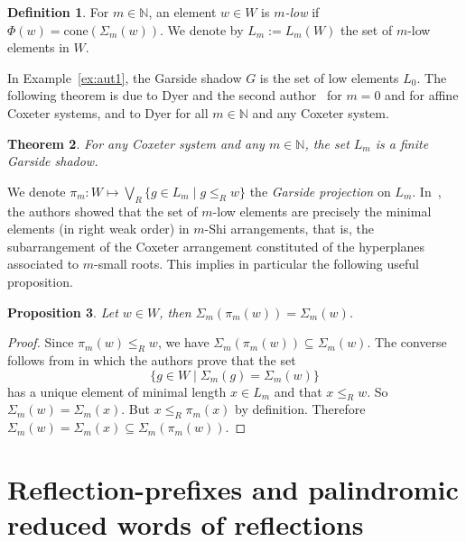\documentclass{amsart}
\newtheorem{Theorem}{Theorem}[section]
\newtheorem{Proposition}[Theorem]{Proposition}
\theoremstyle{definition}
\newtheorem{Definition}[Theorem]{Definition}
\begin{document}
\begin{Definition} For $m\in \mathbb{N}$, an element $w \in W$ is \emph{$m$-low} if $\Phi(w) = \text{cone}(\Sigma_m(w))$. We denote by $L_m:=L_m(W)$ the set of $m$-low elements in $W$.
\end{Definition}

In Example~\ref{ex:aut1}, the Garside shadow $G$ is the set of low elements $L_0$.  The following theorem is due  to Dyer and the second author~\cite[Theorem 1.1]{DH} for $m=0$ and for affine Coxeter systems, and to Dyer \cite[Corollary 1.7]{Dyer} for all $m\in \mathbb N$ and any Coxeter system.

\begin{Theorem} For any Coxeter system and any $m\in \mathbb N$,  the set $L_m$ is a finite Garside shadow.
\end{Theorem}

We denote $\pi_m:W\mapsto  \bigvee_R \{g\in L_m\mid g\leq_R w\}$ the {\em Garside projection} on $L_m$. 
In~\cite{DFHM24}, the authors showed that the set of $m$-low elements are precisely the minimal elements (in right weak order) in $m$-Shi arrangements, that is, the subarrangement of the Coxeter arrangement constituted of the hyperplanes associated to $m$-small roots.  This implies in particular the following useful proposition. 

\begin{Proposition}\label{prop:mSmall} Let $w\in W$, then $\Sigma_m(\pi_m(w))=\Sigma_m(w)$.
\end{Proposition}
\begin{proof} Since $\pi_m(w)\leq_R w$, we have $\Sigma_m(\pi_m(w))\subseteq \Sigma_m(w)$. The converse follows from  \cite[Theorem 6.4]{DFHM24} in which the authors prove that the set 
$$
\{g\in W\mid \Sigma_m(g)=\Sigma_m(w)\}
$$
has a unique element of minimal length $x\in L_m$ and that $x\leq_R w$. So $\Sigma_m(w)=\Sigma_m(x)$. But $x\leq_R\pi_m(x)$ by definition. Therefore  $ \Sigma_m(w)=\Sigma_m(x)\subseteq \Sigma_m(\pi_m(w))$.
\end{proof}



\section{Reflection-prefixes and palindromic reduced words of reflections}\label{se:reflectionprefix}
\end{document}
